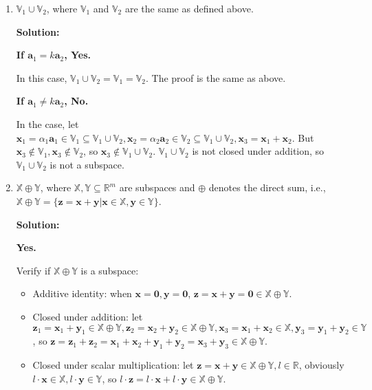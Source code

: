 \documentclass[12pt, letterpaper, onecolumn]{article}
\begin{document}
\begin{enumerate}[start=2]
{\begin{enumerate}
                Above all, $\mathbb{V}_{1} \cap \mathbb{V}_{2}$ is a subspace.
						
				\item %
				$\mathbb{V}_{1} \cup \mathbb{V}_{2}$, where $\mathbb{V}_{1}$ and $\mathbb{V}_{2}$ are the same as defined above.

				\textbf{Solution:}

                \textbf{If $\bm{a}_1 = k \bm{a}_2$, Yes.}
                
                In this case, $\mathbb{V}_{1} \cup \mathbb{V}_{2} = \mathbb{V}_{1} = \mathbb{V}_{2}$. The proof is the same as above.

                \textbf{If $\bm{a}_1 \neq k \bm{a}_2$, No.}

                In the case, let $\bm{x}_1 = \alpha_1 \bm{a}_1 \in \mathbb{V}_1 \subseteq  \mathbb{V}_{1} \cup \mathbb{V}_{2}, \bm{x}_2 = \alpha_2 \bm{a}_2 \in \mathbb{V}_2 \subseteq \mathbb{V}_{1} \cup \mathbb{V}_{2}, \bm{x}_3 = \bm{x}_1 + \bm{x}_2$. But $\bm{x}_3 \notin \mathbb{V}_1, \bm{x}_3 \notin \mathbb{V}_2$, so $\bm{x}_3 \notin \mathbb{V}_{1} \cup \mathbb{V}_{2}$. $\mathbb{V}_{1} \cup \mathbb{V}_{2}$ is not closed under addition, so $\mathbb{V}_{1} \cup \mathbb{V}_{2}$ is not a subspace.
				
				
				\item %
				$\mathbb{X}\oplus\mathbb{Y}$, where $\mathbb{X},\mathbb{Y}\subseteq\mathbb{R}^m$ are subspaces and 
				$\oplus$ denotes the direct sum, i.e., 
				$\mathbb{X}\oplus\mathbb{Y}=\{\bm{z}=\bm{x}+\bm{y}|\bm{x}\in\mathbb{X},\bm{y}\in\mathbb{Y}\}$.

				\textbf{Solution:}

                \textbf{Yes.}

                Verify if $\mathbb{X}\oplus\mathbb{Y}$ is a subspace:

                \begin{itemize}
                    \item Additive identity: when $\bm{x} = \bm{0}, \bm{y} = \bm{0}$, $\bm{z} = \bm{x} + \bm{y} = \bm{0} \in \mathbb{X}\oplus\mathbb{Y}$.
                    \item Closed under addition: let $\bm{z}_1 = \bm{x}_1 + \bm{y}_1 \in \mathbb{X}\oplus\mathbb{Y}, \bm{z}_2 = \bm{x}_2 + \bm{y}_2 \in \mathbb{X}\oplus\mathbb{Y}, \bm{x}_3 = \bm{x}_1 + \bm{x}_2 \in \mathbb{X}, \bm{y}_3 = \bm{y}_1 + \bm{y}_2 \in \mathbb{Y}$, so $\bm{z} = \bm{z}_1 + \bm{z}_2 = \bm{x}_1 + \bm{x}_2 + \bm{y}_1 + \bm{y}_2 = \bm{x}_3 + \bm{y}_3 \in \mathbb{X}\oplus\mathbb{Y}$.
                    \item Closed under scalar multiplication: let $\bm{z} = \bm{x} + \bm{y} \in \mathbb{X}\oplus\mathbb{Y}, l \in \mathbb{R}$, obviously $l\cdot\bm{x} \in \mathbb{X}, l\cdot\bm{y}\in\mathbb{Y}$, so $l\cdot\bm{z} = l\cdot\bm{x} + l\cdot\bm{y}\in \mathbb{X}\oplus\mathbb{Y}$.
                \end{itemize}
				

\end{enumerate}}
\end{enumerate}
\end{document}
